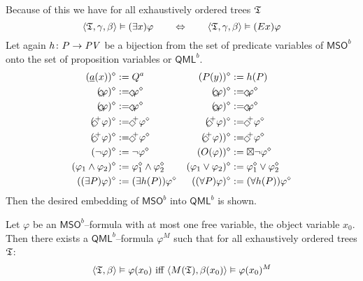 Because of this we have for all exhaustively
ordered trees $\mathfrak{T}$
\begin{equation}
\langle \mathfrak{T}, \gamma, \beta\rangle \vDash (\exists x)\varphi\qquad
\Leftrightarrow\qquad
\langle \mathfrak{T}, \gamma, \beta\rangle \vDash
(E x)\varphi
\end{equation}
Let again $h \colon P \rightarrow \mbox{\it PV\/}$ be a bijection from
the set of predicate variables of $\mathsf{MSO}^b$ onto
the set of proposition variables or $\mathsf{QML}^b$.
\begin{equation}
\begin{split}
(\uli{a}(x))^{\diamond} & := Q^a & (P(y))^{\diamond} & := h(P) \\
(\oben \varphi)^{\diamond} & := \oben \varphi^{\diamond} &
(\unten \varphi)^{\diamond} & := \unten \varphi^{\diamond} \\
(\links\varphi)^{\diamond} & := \links \varphi^{\diamond} &
(\rechts\varphi)^{\diamond} & := \rechts \varphi^{\diamond} \\
(\oben^+\varphi)^{\diamond} & := \oben^+ \varphi^{\diamond} &
(\unten^+\varphi)^{\diamond} & := \unten^+ \varphi^{\diamond} \\
(\rechts^+\varphi)^{\diamond} & := \rechts^+ \varphi^{\diamond} &
(\links^+ \varphi))^{\diamond} & := \links^+ \varphi^{\diamond} \\
(\nicht \varphi)^{\diamond} & := \nicht \varphi^{\diamond} &
(O(\varphi))^{\diamond} & := \master \nicht \varphi^{\diamond} \\
(\varphi_1 \und \varphi_2)^{\diamond} &
    := \varphi_1^{\diamond} \und \varphi_2^{\diamond} &
(\varphi_1 \oder \varphi_2)^{\diamond} &
    := \varphi_1^{\diamond} \oder \varphi_2^{\diamond} \\
((\exists P)\varphi)^{\diamond} & := (\exists h(P))\varphi^{\diamond} &
((\forall P)\varphi)^{\diamond} & := (\forall h(P))\varphi^{\diamond}
\end{split}
\end{equation}
Then the desired embedding of $\mathsf{MSO}^b$
into $\mathsf{QML}^b$ is shown.
\begin{thm}
Let $\varphi$ be an $\mathsf{MSO}^b$--formula with at most
one free variable, the object variable $x_0$. Then there exists
a $\mathsf{QML}^b$--formula $\varphi^M$ such that for all
exhaustively ordered trees $\mathfrak{T}$:
\begin{equation}
\langle \mathfrak{T}, \beta\rangle \vDash \varphi(x_0)
\text{ iff }\langle M(\mathfrak{T}), \beta(x_0)\rangle \vDash
\varphi(x_0)^M
\end{equation}
\end{thm}
